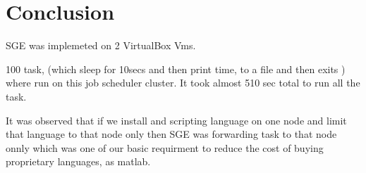 \chapter{Conclusion}

SGE was implemeted on 2 VirtualBox Vms.

100 task, (which sleep for 10secs and then print time, to a file and then exits ) where run on this job scheduler cluster.
It took almost 510 sec total to run all the task. 

It was observed that if we install and scripting language on one node and limit that language to that node only then SGE was forwarding task to that node onnly which was one of our basic requirment to reduce the cost of buying proprietary languages, as matlab.
